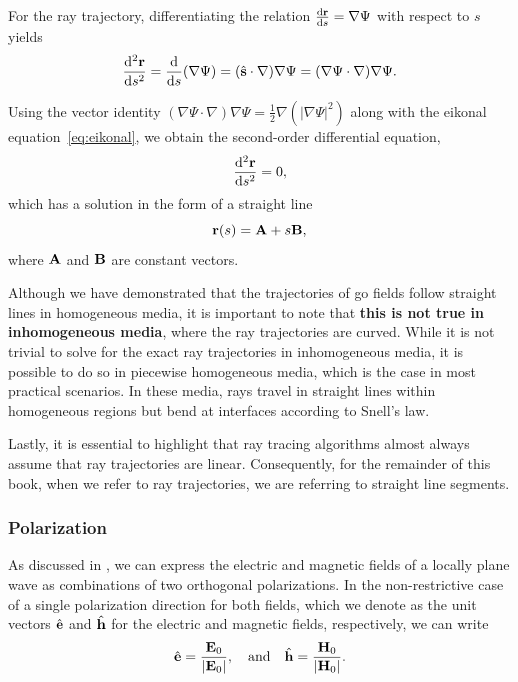 For the ray trajectory, differentiating the relation $\tfrac{\mathrm{d}\mathbf{r}}{\mathrm{d}s} = \nabla\Psi$ with respect to $s$ yields
\begin{equation}
  \frac{\mathrm{d}^2\mathbf{r}}{\mathrm{d}s^2} = \frac{\mathrm{d}}{\mathrm{d}s}(\nabla\Psi) = (\hat{\mathbf{s}}\cdot\nabla)\nabla\Psi = (\nabla\Psi\cdot\nabla)\nabla\Psi.
\end{equation}

Using the vector identity $(\nabla\Psi\cdot\nabla)\nabla\Psi = \tfrac{1}{2}\nabla(|\nabla\Psi|^2)$ along with the eikonal equation~\eqref{eq:eikonal}, we obtain the second-order differential equation,
\begin{equation}
  \frac{\mathrm{d}^2\mathbf{r}}{\mathrm{d}s^2} = 0,
\end{equation}
which has a solution in the form of a straight line
\begin{equation}
  \mathbf{r}(s) = \mathbf{A} + s \mathbf{B},
\end{equation}
where $\mathbf{A}$ and $\mathbf{B}$ are constant vectors.

Although we have demonstrated that the trajectories of \gls{go} fields follow straight lines in homogeneous media, it is important to note that \textbf{this is not true in inhomogeneous media}, where the ray trajectories are curved. While it is not trivial to solve for the exact ray trajectories in inhomogeneous media, it is possible to do so in piecewise homogeneous media, which is the case in most practical scenarios. In these media, rays travel in straight lines within homogeneous regions but bend at interfaces according to Snell's law.

Lastly, it is essential to highlight that ray tracing algorithms almost always assume that ray trajectories are linear. Consequently, for the remainder of this book, when we refer to ray trajectories, we are referring to straight line segments.

\subsubsection{Polarization}

As discussed in , we can express the electric and magnetic fields of a locally plane wave as combinations of two orthogonal polarizations. In the non-restrictive case of a single polarization direction for both fields, which we denote as the unit vectors $\hat{\mathbf{e}}$ and $\hat{\mathbf{h}}$ for the electric and magnetic fields, respectively, we can write
\begin{equation}
  \hat{\mathbf{e}} = \frac{\mathbf{E}_0}{|\mathbf{E}_0|}, \quad \text{and} \quad \hat{\mathbf{h}} = \frac{\mathbf{H}_0}{|\mathbf{H}_0|}.
\end{equation}


